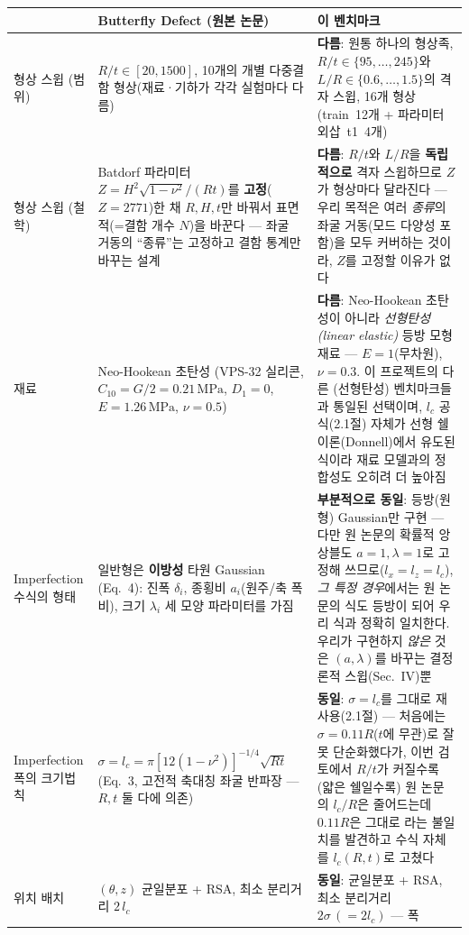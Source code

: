 \documentclass[11pt]{article}
\begin{document}
\begin{longtable}{@{}p{2.6cm}p{5.4cm}p{5.4cm}@{}}
\toprule
 & \textbf{Butterfly Defect (원본 논문)} & \textbf{이 벤치마크} \\
\midrule
\endhead
형상 스윕 (범위) &
  $R/t \in [20, 1500]$, 10개의 개별 다중결함 형상(재료·기하가 각각 실험마다
  다름) &
  \textbf{다름}: 원통 하나의 형상족, $R/t\in\{95,\dots,245\}$와
  $L/R\in\{0.6,\dots,1.5\}$의 격자 스윕, 16개 형상 (train~12개 + 파라미터
  외삽~t1~4개) \\
\addlinespace
형상 스윕 (철학) &
  Batdorf 파라미터 $Z=H^2\sqrt{1-\nu^2}/(Rt)$를 \textbf{고정}($Z{=}2771$)한
  채 $R,H,t$만 바꿔서 표면적(=결함 개수 $N$)을 바꾼다 --- 좌굴 거동의
  ``종류''는 고정하고 결함 통계만 바꾸는 설계 &
  \textbf{다름}: $R/t$와 $L/R$을 \textbf{독립적으로} 격자 스윕하므로 $Z$가
  형상마다 달라진다 --- 우리 목적은 여러 \emph{종류}의 좌굴 거동(모드
  다양성 포함)을 모두 커버하는 것이라, $Z$를 고정할 이유가 없다 \\
\addlinespace
재료 &
  Neo-Hookean 초탄성 (VPS-32 실리콘, $C_{10}=G/2=0.21\,\mathrm{MPa}$,
  $D_1{=}0$, $E=1.26\,\mathrm{MPa}$, $\nu{=}0.5$) &
  \textbf{다름}: Neo-Hookean 초탄성이 아니라 \emph{선형탄성(linear
  elastic)} 등방 모형재료 --- $E{=}1$(무차원), $\nu{=}0.3$. 이 프로젝트의
  다른 (선형탄성) 벤치마크들과 통일된 선택이며, $l_c$ 공식(2.1절) 자체가
  선형 쉘이론(Donnell)에서 유도된 식이라 재료 모델과의 정합성도 오히려
  더 높아짐 \\
\addlinespace
Imperfection 수식의 형태 &
  일반형은 \textbf{이방성} 타원 Gaussian (Eq.~4): 진폭 $\delta_i$, 종횡비
  $a_i$(원주/축 폭 비), 크기 $\lambda_i$ 세 모양 파라미터를 가짐 &
  \textbf{부분적으로 동일}: 등방(원형) Gaussian만 구현 --- 다만 원 논문의
  확률적 앙상블도 $a{=}1,\lambda{=}1$로 고정해 쓰므로($l_x{=}l_z{=}l_c$),
  \emph{그 특정 경우}에서는 원 논문의 식도 등방이 되어 우리 식과 정확히
  일치한다. 우리가 구현하지 \emph{않은} 것은 $(a,\lambda)$를 바꾸는
  결정론적 스윕(Sec.~IV)뿐 \\
\addlinespace
Imperfection 폭의 크기법칙 &
  $\sigma = l_c = \pi[12(1-\nu^2)]^{-1/4}\sqrt{Rt}$ (Eq.~3, 고전적 축대칭
  좌굴 반파장 --- $R,t$ 둘 다에 의존) &
  \textbf{동일}: $\sigma = l_c$를 그대로 재사용(2.1절) --- 처음에는
  $\sigma=0.11R$($t$에 무관)로 잘못 단순화했다가, 이번 검토에서 $R/t$가
  커질수록(얇은 쉘일수록) 원 논문의 $l_c/R$은 줄어드는데 $0.11R$은 그대로
  라는 불일치를 발견하고 수식 자체를 $l_c(R,t)$로 고쳤다 \\
\addlinespace
위치 배치 &
  $(\theta,z)$ 균일분포 + RSA, 최소 분리거리 $2\,l_c$ &
  \textbf{동일}: 균일분포 + RSA, 최소 분리거리 $2\sigma\,(=2l_c)$ --- 폭

\end{longtable}
\end{document}
